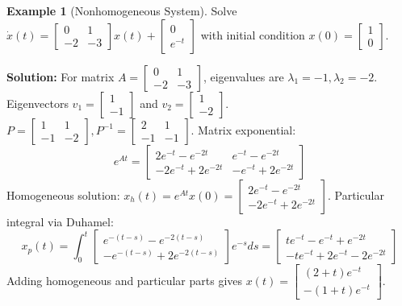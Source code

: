 \documentclass[12pt,a4paper,oneside]{article}
\theoremstyle{definition}
\newtheorem{example}{Example}[section]
\theoremstyle{plain}
\begin{document}
\begin{example}[Nonhomogeneous System]
Solve $\dot{x}(t) = \begin{bmatrix} 0 & 1 \\ -2 & -3 \end{bmatrix} x(t) + \begin{bmatrix} 0 \\ e^{-t} \end{bmatrix}$ with initial condition $x(0) = \begin{bmatrix} 1 \\ 0 \end{bmatrix}$.

\textbf{Solution:}
For matrix $A = \begin{bmatrix} 0 & 1 \\ -2 & -3 \end{bmatrix}$, eigenvalues are $\lambda_1 = -1, \lambda_2 = -2$.
Eigenvectors $v_1 = \begin{bmatrix} 1 \\ -1 \end{bmatrix}$ and $v_2 = \begin{bmatrix} 1 \\ -2 \end{bmatrix}$.
$P = \begin{bmatrix} 1 & 1 \\ -1 & -2 \end{bmatrix}, P^{-1} = \begin{bmatrix} 2 & 1 \\ -1 & -1 \end{bmatrix}$.
Matrix exponential:
\begin{equation}
    e^{At} = \begin{bmatrix} 2e^{-t} - e^{-2t} & e^{-t} - e^{-2t} \\ -2e^{-t} + 2e^{-2t} & -e^{-t} + 2e^{-2t} \end{bmatrix}
\end{equation}
Homogeneous solution: $x_h(t) = e^{At} x(0) = \begin{bmatrix} 2e^{-t} - e^{-2t} \\ -2e^{-t} + 2e^{-2t} \end{bmatrix}$.
Particular integral via Duhamel:
\begin{equation}
    x_p(t) = \int_0^t \begin{bmatrix} e^{-(t-s)} - e^{-2(t-s)} \\ -e^{-(t-s)} + 2e^{-2(t-s)} \end{bmatrix} e^{-s} ds = \begin{bmatrix} t e^{-t} - e^{-t} + e^{-2t} \\ -t e^{-t} + 2e^{-t} - 2e^{-2t} \end{bmatrix}
\end{equation}
Adding homogeneous and particular parts gives $x(t) = \begin{bmatrix} (2 + t) e^{-t} \\ -(1 + t) e^{-t} \end{bmatrix}$.
\end{example}
\end{document}
